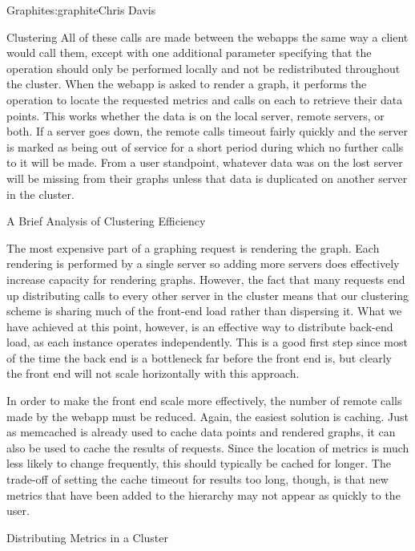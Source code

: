 \begin{aosachapter}{Graphite}{s:graphite}{Chris Davis}
\begin{aosasect1}{Clustering}
All of these calls are made between the webapps the same way a client
would call them, except with one additional parameter specifying that
the operation should only be performed locally and not be
redistributed throughout the cluster.  When the webapp is asked to
render a graph, it performs the  operation to locate the
requested metrics and calls  on each to retrieve their
data points. This works whether the data is on the local server,
remote servers, or both. If a server goes down, the remote calls
timeout fairly quickly and the server is marked as being out of
service for a short period during which no further calls to it will be
made. From a user standpoint, whatever data was on the lost server
will be missing from their graphs unless that data is duplicated on
another server in the cluster.

\begin{aosasect2}{A Brief Analysis of Clustering Efficiency}

The most expensive part of a graphing request is rendering the graph.
Each rendering is performed by a single server so adding more servers
does effectively increase capacity for rendering graphs. However, the
fact that many requests end up distributing  calls to every
other server in the cluster means that our clustering scheme is
sharing much of the front-end load rather than dispersing it.  What we
have achieved at this point, however, is an effective way to
distribute back-end load, as each  instance operates
independently.  This is a good first step since most of the time the
back end is a bottleneck far before the front end is, but clearly the
front end will not scale horizontally with this approach.

In order to make the front end scale more effectively, the number of
remote  calls made by the webapp must be reduced. Again,
the easiest solution is caching. Just as memcached is already used to
cache data points and rendered graphs, it can also be used to cache
the results of  requests.  Since the location of metrics is
much less likely to change frequently, this should typically be cached
for longer. The trade-off of setting the cache timeout for 
results too long, though, is that new metrics that have been added to
the hierarchy may not appear as quickly to the user.

\end{aosasect2}

\begin{aosasect2}{Distributing Metrics in a Cluster}


\end{aosasect2}
\end{aosasect1}
\end{aosachapter}
